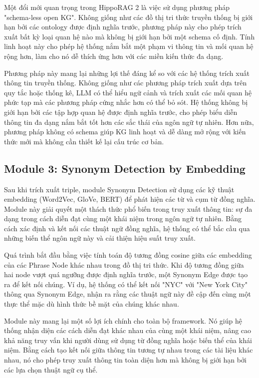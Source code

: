 \documentclass[../main.tex]{subfiles}
\begin{document}
Một đổi mới quan trọng trong HippoRAG 2 là việc sử dụng phương pháp "schema-less open KG". Không giống như các đồ thị tri thức truyền thống bị giới hạn bởi các ontology được định nghĩa trước, phương pháp này cho phép trích xuất bất kỳ loại quan hệ nào mà không bị giới hạn bởi một schema cố định. Tính linh hoạt này cho phép hệ thống nắm bắt một phạm vi thông tin và mối quan hệ rộng hơn, làm cho nó dễ thích ứng hơn với các miền kiến thức đa dạng.

Phương pháp này mang lại những lợi thế đáng kể so với các hệ thống trích xuất thông tin truyền thống. Không giống như các phương pháp trích xuất dựa trên quy tắc hoặc thống kê, LLM có thể hiểu ngữ cảnh và trích xuất các mối quan hệ phức tạp mà các phương pháp cứng nhắc hơn có thể bỏ sót. Hệ thống không bị giới hạn bởi các tập hợp quan hệ được định nghĩa trước, cho phép biểu diễn thông tin đa dạng nắm bắt tốt hơn các sắc thái của ngôn ngữ tự nhiên. Hơn nữa, phương pháp không có schema giúp KG linh hoạt và dễ dàng mở rộng với kiến thức mới mà không cần thiết kế lại cấu trúc cơ bản.

\subsection{Module 3: Synonym Detection by Embedding}
Sau khi trích xuất triple, module Synonym Detection sử dụng các kỹ thuật embedding (Word2Vec, GloVe, BERT) để phát hiện các từ và cụm từ đồng nghĩa. Module này giải quyết một thách thức phổ biến trong truy xuất thông tin: sự đa dạng trong cách diễn đạt cùng một khái niệm trong ngôn ngữ tự nhiên. Bằng cách xác định và kết nối các thuật ngữ đồng nghĩa, hệ thống có thể bắc cầu qua những biến thể ngôn ngữ này và cải thiện hiệu suất truy xuất.

Quá trình bắt đầu bằng việc tính toán độ tương đồng cosine giữa các embedding của các Phrase Node khác nhau trong đồ thị tri thức. Khi độ tương đồng giữa hai node vượt quá ngưỡng được định nghĩa trước, một Synonym Edge được tạo ra để kết nối chúng. Ví dụ, hệ thống có thể kết nối "NYC" với "New York City" thông qua Synonym Edge, nhận ra rằng các thuật ngữ này đề cập đến cùng một thực thể mặc dù hình thức bề mặt của chúng khác nhau.

Module này mang lại một số lợi ích chính cho toàn bộ framework. Nó giúp hệ thống nhận diện các cách diễn đạt khác nhau của cùng một khái niệm, nâng cao khả năng truy vấn khi người dùng sử dụng từ đồng nghĩa hoặc biến thể của khái niệm. Bằng cách tạo kết nối giữa thông tin tương tự nhau trong các tài liệu khác nhau, nó cho phép truy xuất thông tin toàn diện hơn mà không bị giới hạn bởi các lựa chọn thuật ngữ cụ thể.
\end{document}
